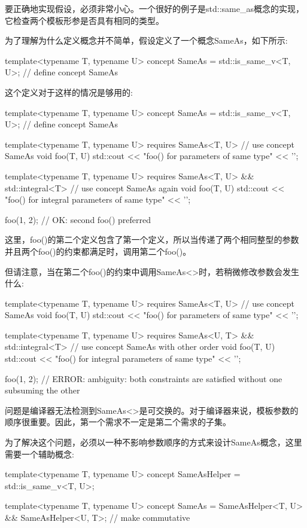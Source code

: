 要正确地实现假设，必须非常小心。一个很好的例子是std::same\_as概念的实现，它检查两个模板形参是否具有相同的类型。

为了理解为什么定义概念并不简单，假设定义了一个概念SameAs，如下所示:

\begin{cpp}
template<typename T, typename U>
concept SameAs = std::is_same_v<T, U>; // define concept SameAs
\end{cpp}

这个定义对于这样的情况是够用的:

\begin{cpp}
template<typename T, typename U>
concept SameAs = std::is_same_v<T, U>; // define concept SameAs

template<typename T, typename U>
requires SameAs<T, U> // use concept SameAs
void foo(T, U)
{
	std::cout << "foo() for parameters of same type" << '\n';
}

template<typename T, typename U>
requires SameAs<T, U> && std::integral<T> // use concept SameAs again
void foo(T, U)
{
	std::cout << "foo() for integral parameters of same type" << '\n';
}

foo(1, 2); // OK: second foo() preferred
\end{cpp}

这里，foo()的第二个定义包含了第一个定义，所以当传递了两个相同整型的参数并且两个foo()的约束都满足时，调用第二个foo()。

但请注意，当在第二个foo()的约束中调用SameAs<>时，若稍微修改参数会发生什么:

\begin{cpp}
template<typename T, typename U>
requires SameAs<T, U> // use concept SameAs
void foo(T, U)
{
	std::cout << "foo() for parameters of same type" << '\n';
}

template<typename T, typename U>
requires SameAs<U, T> && std::integral<T> // use concept SameAs with other order
void foo(T, U)
{
	std::cout << "foo() for integral parameters of same type" << '\n';
}

foo(1, 2); // ERROR: ambiguity: both constraints are satisfied without one subsuming the other
\end{cpp}

问题是编译器无法检测到SameAs<>是可交换的。对于编译器来说，模板参数的顺序很重要。因此，第一个需求不一定是第二个需求的子集。

为了解决这个问题，必须以一种不影响参数顺序的方式来设计SameAs概念，这里需要一个辅助概念:

\begin{cpp}
template<typename T, typename U>
concept SameAsHelper = std::is_same_v<T, U>;

template<typename T, typename U>
concept SameAs = SameAsHelper<T, U> && SameAsHelper<U, T>; // make commutative
\end{cpp}

